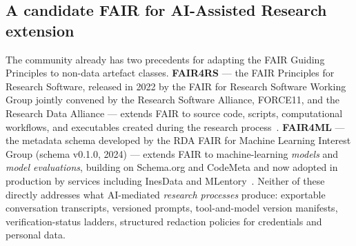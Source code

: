 \documentclass[11pt,a4paper]{article}
\begin{document}
\subsection{A candidate FAIR for AI-Assisted Research extension}
\label{sec:fair4ai}

The community already has two precedents for adapting the FAIR Guiding
Principles to non-data artefact classes. \textbf{FAIR4RS} --- the FAIR
Principles for Research Software, released in 2022 by the FAIR for
Research Software Working Group jointly convened by the Research
Software Alliance, FORCE11, and the Research Data Alliance --- extends
FAIR to source code, scripts, computational workflows, and executables
created during the research process~\citep{chuehong2022fair4rs}.
\textbf{FAIR4ML} --- the metadata schema developed by the RDA FAIR for
Machine Learning Interest Group (schema v0.1.0, 2024) --- extends FAIR
to machine-learning \emph{models} and \emph{model evaluations}, building
on Schema.org and CodeMeta and now adopted in production by services
including InesData and MLentory~\citep{rda2024fair4ml}. Neither of
these directly addresses what AI-mediated \emph{research processes}
produce: exportable conversation transcripts, versioned prompts,
tool-and-model version manifests, verification-status ladders,
structured redaction policies for credentials and personal data.
\end{document}
